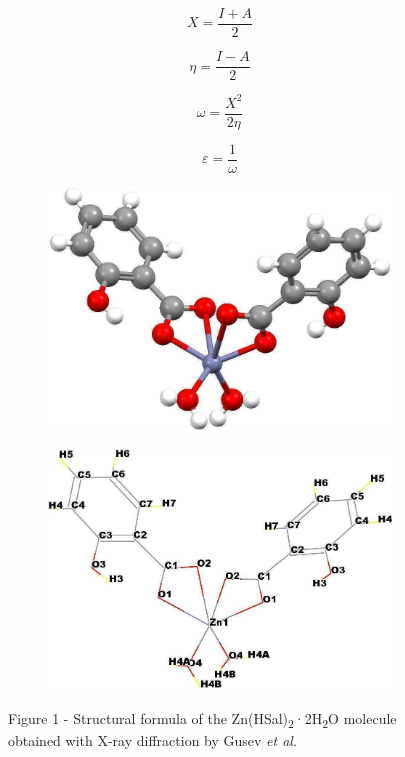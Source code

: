 \begin{multicols}{2}
\begin{equation}
    X=\frac{I+A}{2}
\end{equation}

\begin{equation}
    \eta=\frac{I-A}{2}
\end{equation}

\begin{equation}
    \omega=\frac{X^2}{2\eta}
\end{equation}

\begin{equation}
    \varepsilon=\frac{1}{\omega}
\end{equation}
\end{multicols}

\begin{figure}[H]
    \centering
    \begin{subfigure}[b]{0.45\textwidth}
        \centering
        \includegraphics[width=\textwidth]{assets/37}
    \end{subfigure}
    \hfill
    \begin{subfigure}[b]{0.45\textwidth}
        \centering
        \includegraphics[width=\textwidth]{assets/38}
    \end{subfigure}
    \caption*{Figure 1 - Structural formula of the Zn(HSal)\textsubscript{2}·2H\textsubscript{2}O molecule obtained with X-ray diffraction by Gusev \emph{et al}.}
\end{figure}

